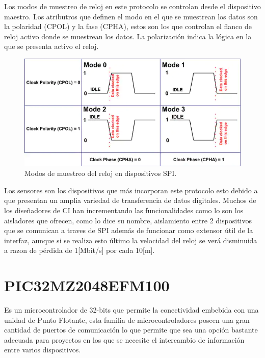 \documentclass[letterpaper,12pt,oneside]{book}
\begin{document}
			Los modos de muestreo de reloj en este protocolo se controlan desde el dispositivo maestro. Los atributros que definen el modo en el que se muestrean los datos son la polaridad (CPOL) y la fase (CPHA), estos son los que controlan el flanco de reloj activo donde se muestrean los datos. La polarización indica la lógica en la que se presenta activo el reloj.

			\begin{figure}[!htpb]
				\centering
				\includegraphics[scale = 0.6]{Material de Consulta/CLK_SPI.PNG}
				\caption[Modos de reloj SPI]{Modos de muestreo del reloj en dispositivos SPI.}
				\label{SPICLK}
			\end{figure}

			Los sensores son los dispositivos que más incorporan este protocolo esto debido a que presentan un amplia variedad de transferencia de datos digitales. Muchos de los diseñadores de CI han incrementando las funcionalidades como lo son los aisladores que ofrecen, como lo dice su nombre, aislamiento entre 2 dispositivos que se comunican a traves de SPI además de funcionar como extensor útil de la interfaz, aunque si se realiza esto último la velocidad del reloj se verá disminuida a razon de pérdida de 1[Mbit/s] por cada 10[m].
			
		\section{PIC32MZ2048EFM100}
		Es un microcontrolador de 32-bits que permite la conectividad embebida con una unidad de Punto Flotante, esta familia de microcontroladores poseen una gran cantidad de puertos de comunicación lo que permite que sea una opción bastante adecuada para proyectos en los que se necesite el intercambio de información entre varios dispositivos.\cite{PIC32MZ}
\end{document}
